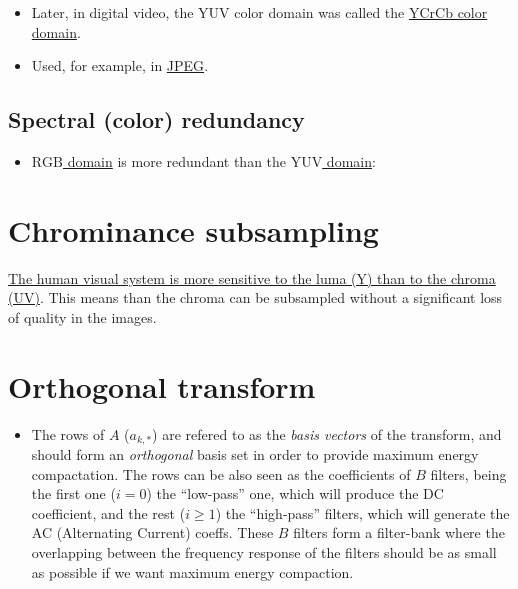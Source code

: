 \begin{itemize}
\item
  Later, in digital video, the YUV color domain was called the
  \href{https://en.wikipedia.org/wiki/YCbCr}{YCrCb color domain}.
\item
  Used, for example, in \href{https://en.wikipedia.org/wiki/JPEG}{JPEG}.
\end{itemize}

\subsection{Spectral (color) redundancy}
\begin{itemize}
\tightlist
\item
  \href{https://en.wikipedia.org/wiki/RGB_color_model}{\(\text{RGB}\)
  domain} is more redundant than the
  \href{https://en.wikipedia.org/wiki/YUV}{\(\text{YUV}\) domain}:
\end{itemize}


\section{Chrominance subsampling}
\href{https://en.wikipedia.org/wiki/Chroma_subsampling}{The human visual
system is more sensitive to the luma (Y) than to the chroma (UV)}. This
means than the chroma can be subsampled without a significant loss of
quality in the images.



\section{Orthogonal transform}
\begin{itemize}
\tightlist
\item
  The rows of \(A\) (\(a_{k,*}\)) are refered to as the \emph{basis
  vectors} of the transform, and should form an \emph{orthogonal} basis
  set in order to provide maximum energy compactation. The rows can be
  also seen as the coefficients of \(B\) filters, being the first one
  (\(i=0\)) the ``low-pass'' one, which will produce the DC coefficient,
  and the rest (\(i\geq 1\)) the ``high-pass'' filters, which will
  generate the AC (Alternating Current) coeffs. These \(B\) filters form
  a filter-bank where the overlapping between the frequency response of
  the filters should be as small as possible if we want maximum energy
  compaction.
\end{itemize}

